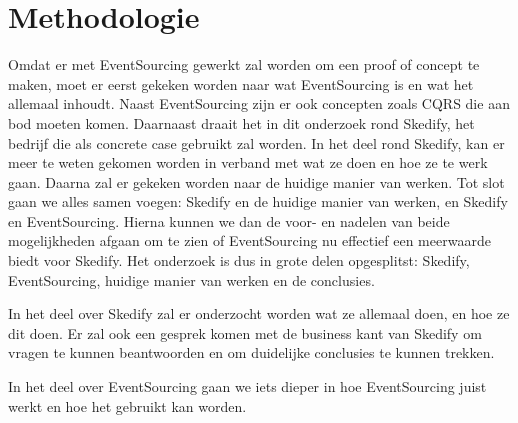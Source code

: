 
\chapter{Methodologie}
\label{ch:methodologie}



Omdat er met EventSourcing gewerkt zal worden om een proof of concept te maken, moet er eerst gekeken worden naar wat EventSourcing is en wat het allemaal inhoudt. Naast EventSourcing zijn er ook concepten zoals CQRS die aan bod moeten komen. Daarnaast draait het in dit onderzoek rond Skedify, het bedrijf die als concrete case gebruikt zal worden. In het deel rond Skedify, kan er meer te weten gekomen worden in verband met wat ze doen en hoe ze te werk gaan. Daarna zal er gekeken worden naar de huidige manier van werken. Tot slot gaan we alles samen voegen: Skedify en de huidige manier van werken, en Skedify en EventSourcing. Hierna kunnen we dan de voor- en nadelen van beide mogelijkheden afgaan om te zien of EventSourcing nu effectief een meerwaarde biedt voor Skedify. Het onderzoek is dus in grote delen opgesplitst: Skedify, EventSourcing, huidige manier van werken en de conclusies.

In het deel over Skedify zal er onderzocht worden wat ze allemaal doen, en hoe ze dit doen. Er zal ook een gesprek komen met de business kant van Skedify om vragen te kunnen beantwoorden en om duidelijke conclusies te kunnen trekken.

In het deel over EventSourcing gaan we iets dieper in hoe EventSourcing juist werkt en hoe het gebruikt kan worden.